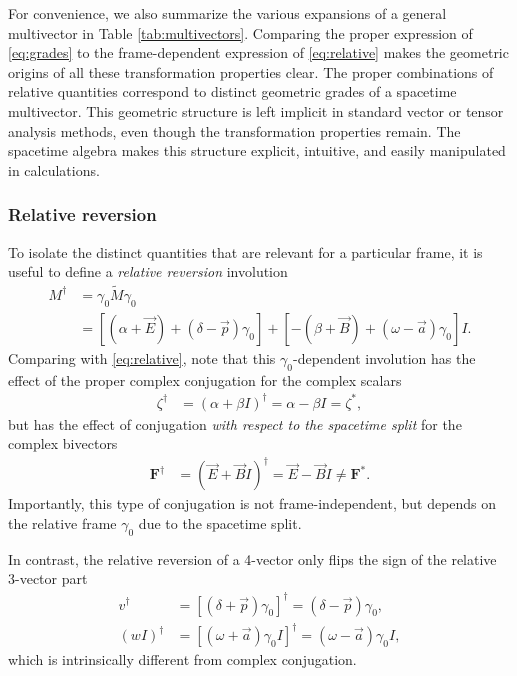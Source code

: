 \documentclass[1p,sort&compress]{elsarticle}
\numberwithin{equation}{section}
\newcommand{\rv}[1]{\vec{#1}}
\newcommand{\bv}[1]{\mathbf{#1}}
\begin{document}
For convenience, we also summarize the various expansions of a general multivector in Table \ref{tab:multivectors}.  Comparing the proper expression of \eqref{eq:grades} to the frame-dependent expression of \eqref{eq:relative} makes the geometric origins of all these transformation properties clear.  The proper combinations of relative quantities correspond to distinct geometric grades of a spacetime multivector.  This geometric structure is left implicit in standard vector or tensor analysis methods, even though the transformation properties remain.  The spacetime algebra makes this structure explicit, intuitive, and easily manipulated in calculations.


\subsubsection{Relative reversion}


To isolate the distinct quantities that are relevant for a particular frame, it is useful to define a \emph{relative reversion} involution
\begin{align}\label{eq:relativereversion}
  M^\dagger &= \gamma_0 \widetilde{M} \gamma_0 \\
  &= \left[(\alpha + \rv{E}) + (\delta - \rv{p})\gamma_0\right] + \left[-(\beta + \rv{B}) + (\omega - \rv{a})\gamma_0\right]I. \nonumber
\end{align}
Comparing with \eqref{eq:relative}, note that this $\gamma_0$-dependent involution has the effect of the proper complex conjugation for the complex scalars 
\begin{align}
  \zeta^\dagger &= (\alpha + \beta I)^\dagger = \alpha - \beta I = \zeta^*,
\end{align}
but has the effect of conjugation \emph{with respect to the spacetime split} for the complex bivectors
\begin{align}\label{eq:relativeconjugation}
 \bv{F}^\dagger &= (\rv{E} + \rv{B}I)^\dagger = \rv{E} - \rv{B}I \neq \bv{F}^*.
\end{align}
Importantly, this type of conjugation is not frame-independent, but depends on the relative frame $\gamma_0$ due to the spacetime split.

In contrast, the relative reversion of a 4-vector only flips the sign of the relative 3-vector part 
\begin{align}
  v^\dagger &= [(\delta + \rv{p})\gamma_0]^\dagger = (\delta - \rv{p})\gamma_0, \\
  (wI)^\dagger &= [(\omega + \rv{a})\gamma_0I]^\dagger = (\omega - \rv{a})\gamma_0I, \nonumber
\end{align}
which is intrinsically different from complex conjugation.
\end{document}

